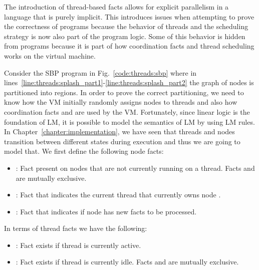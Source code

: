 The introduction of thread-based facts allows for explicit parallelism in a
language that is purely implicit. This introduces issues when attempting to
prove the correctness of programs because the behavior of threads and the
scheduling strategy is now also part of the program logic. Some of this behavior
is hidden from programs because it is part of how coordination facts and thread
scheduling works on the virtual machine.

Consider the SBP program in Fig.~\ref{code:threads:sbp} where in
lines~\ref{line:threads:splash_part1}-\ref{line:threads:splash_part2} the graph
of nodes is partitioned into regions. In order to prove the correct
partitioning, we need to know how the VM initially randomly assigns nodes to
threads and also how coordination facts  and 
are used by the VM.  Fortunately, since linear logic is the foundation of LM, it
is possible to model the semantics of LM by using LM rules. In
Chapter~\ref{chapter:implementation}, we have seen that threads and nodes
transition between different states during execution and thus we are going to
model that. We first define the following node facts:

\begin{itemize}

   \item {}: Fact present on nodes that are not currently
      running on a thread. Facts  and  are
      mutually exclusive.

   \item {}: Fact that indicates the current thread
       that currently owns node .

   \item {}: Fact that indicates if node
       has new facts to be processed.

\end{itemize}

In terms of thread facts we have the following:

\begin{itemize}
   \item {}: Fact exists if thread  is currently
      active.

   \item {}: Fact exists if thread  is currently
      idle. Facts  and  are mutually exclusive.
\end{itemize}

